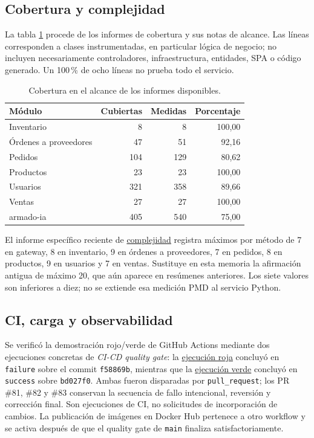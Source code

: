 \documentclass[12pt,a4paper]{article}
\newcommand{\evidencia}[2]{\href{https://github.com/JoseLozanoMorales/TiendaTech/blob/e6680b0290d2c6921ea47116c2df60bd7b055de0/#1}{#2}}
\begin{document}
\subsection{Cobertura y complejidad}
La tabla \ref{tab:cobertura} procede de los informes de cobertura y sus notas de alcance. Las líneas corresponden a clases instrumentadas, en particular lógica de negocio; no incluyen necesariamente controladores, infraestructura, entidades, SPA o código generado. Un 100\,\% de ocho líneas no prueba todo el servicio.

\begin{table}[H]\centering\small
\caption{Cobertura en el alcance de los informes disponibles.}\label{tab:cobertura}
\begin{tabular}{lrrr}
\toprule Módulo & Cubiertas & Medidas & Porcentaje\\\midrule
Inventario & 8 & 8 & 100,00\\
Órdenes a proveedores & 47 & 51 & 92,16\\
Pedidos & 104 & 129 & 80,62\\
Productos & 23 & 23 & 100,00\\
Usuarios & 321 & 358 & 89,66\\
Ventas & 27 & 27 & 100,00\\
armado-ia & 405 & 540 & 75,00\\\bottomrule
\end{tabular}
\end{table}

El informe específico reciente de \evidencia{docs/experimentos/resultados/iso25010/complejidad/summary.csv}{complejidad} registra máximos por método de 7 en gateway, 8 en inventario, 9 en órdenes a proveedores, 7 en pedidos, 8 en productos, 9 en usuarios y 7 en ventas. Sustituye en esta memoria la afirmación antigua de máximo 20, que aún aparece en resúmenes anteriores. Los siete valores son inferiores a diez; no se extiende esa medición PMD al servicio Python.

\subsection{CI, carga y observabilidad}
Se verificó la demostración rojo/verde de GitHub Actions mediante dos ejecuciones concretas de \emph{CI-CD quality gate}: la \href{https://github.com/JoseLozanoMorales/TiendaTech/actions/runs/33554959074}{ejecución roja} concluyó en \texttt{failure} sobre el commit \texttt{f58869b}, mientras que la \href{https://github.com/JoseLozanoMorales/TiendaTech/actions/runs/33557738789}{ejecución verde} concluyó en \texttt{success} sobre \texttt{bd027f0}. Ambas fueron disparadas por \texttt{pull\_request}; los PR \#81, \#82 y \#83 conservan la secuencia de fallo intencional, reversión y corrección final. Son ejecuciones de CI, no solicitudes de incorporación de cambios. La publicación de imágenes en Docker Hub pertenece a otro workflow y se activa después de que el quality gate de \texttt{main} finaliza satisfactoriamente.
\end{document}
